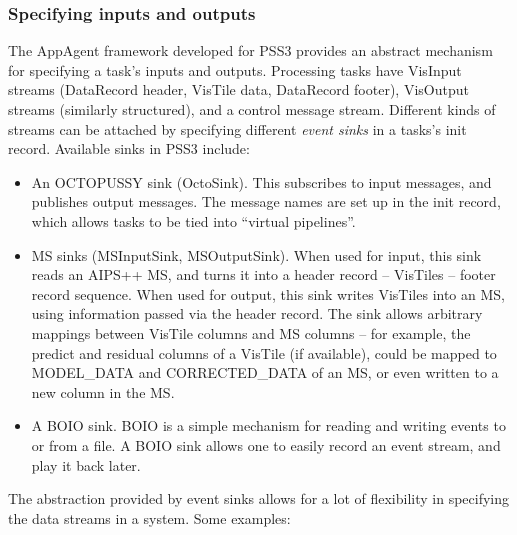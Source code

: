 \documentclass[12pt]{article}
\begin{document}
\subsubsection{Specifying inputs and outputs}

  The AppAgent framework developed for PSS3 provides an abstract mechanism for
  specifying a task's inputs and outputs. Processing tasks have VisInput 
  streams (DataRecord header, VisTile data, DataRecord footer), VisOutput 
  streams (similarly structured), and a control message stream. Different kinds
  of streams can be attached by specifying different {\em event sinks} in a
  tasks's init record. Available sinks in PSS3 include:

  \begin{itemize}
  
  \item An OCTOPUSSY sink (OctoSink). This subscribes to input messages, and
  publishes output messages. The message names are set up in the init record,
  which allows tasks to be tied into ``virtual pipelines''.

  \item MS sinks (MSInputSink, MSOutputSink). When used for input, this sink
  reads an AIPS++ MS, and turns it into a header record -- VisTiles -- footer
  record sequence. When used for output, this sink writes VisTiles into an MS,
  using information passed via the header record. The sink allows arbitrary
  mappings between VisTile columns and MS columns -- for example, the predict
  and residual columns of a VisTile (if available), could be mapped to
  MODEL\_DATA and CORRECTED\_DATA of an MS, or even written to a new column in
  the MS. 

  \item A BOIO sink. BOIO is a simple mechanism for reading and writing events
  to or from a file. A BOIO sink allows one to easily record an event stream,
  and play it back later. 

  \end{itemize}
  
  The abstraction provided by event sinks allows for a lot of flexibility in
  specifying the data streams in a system. Some examples:
  
\end{document}
